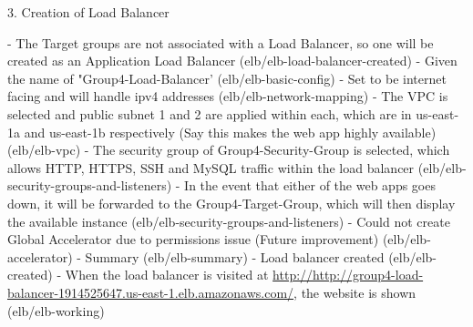 3. Creation of Load Balancer

- The Target groups are not associated with a Load Balancer, so one will be created as an Application Load Balancer
(elb/elb-load-balancer-created)
- Given the name of "Group4-Load-Balancer' (elb/elb-basic-config)
- Set to be internet facing and will handle ipv4 addresses (elb/elb-network-mapping)
- The VPC is selected and public subnet 1 and 2 are applied within each, which are in us-east-1a and us-east-1b
respectively (Say this makes the web app highly available) (elb/elb-vpc)
- The security group of Group4-Security-Group is selected, which allows HTTP, HTTPS, SSH and MySQL traffic within
the load balancer (elb/elb-security-groups-and-listeners)
- In the event that either of the web apps goes down, it will be forwarded to the Group4-Target-Group, which will then
display the available instance (elb/elb-security-groups-and-listeners)
- Could not create Global Accelerator due to permissions issue (Future improvement) (elb/elb-accelerator)
- Summary (elb/elb-summary)
- Load balancer created (elb/elb-created)
- When the load balancer is visited at
\href{http://http://group4-load-balancer-1914525647.us-east-1.elb.amazonaws.com/}{http://http://group4-load-balancer-1914525647.us-east-1.elb.amazonaws.com/},
the website is shown (elb/elb-working)















